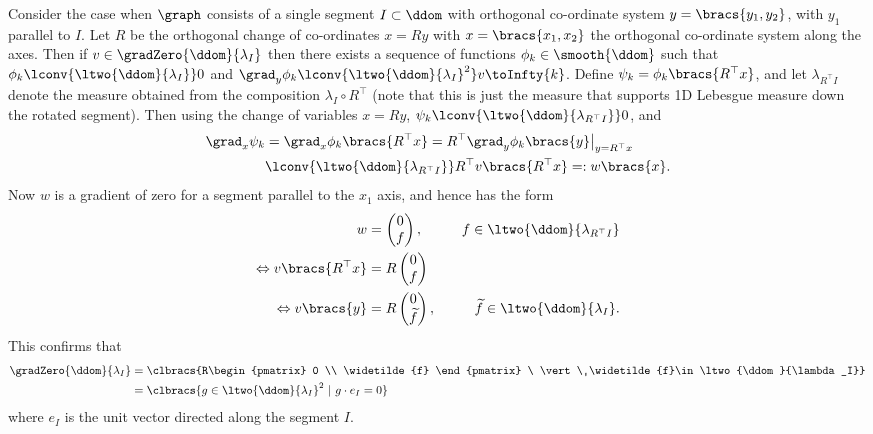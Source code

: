 Consider the case when $\graph$ consists of a single segment $I\subset\ddom$ with orthogonal co-ordinate system $y=\bracs{y_1,y_2}$, with $y_1$ parallel to $I$.
Let $R$ be the orthogonal change of co-ordinates $x=Ry$ with $x=\bracs{x_1,x_2}$ the orthogonal co-ordinate system along the axes.
Then if $v\in\gradZero{\ddom}{\lambda_I}$ then there exists a sequence of functions $\phi_k\in\smooth{\ddom}$ such that $\phi_k\lconv{\ltwo{\ddom}{\lambda_I}}0$ and $\grad_y\phi_k\lconv{\ltwo{\ddom}{\lambda_I}^2} v \toInfty{k}$.
Define $\psi_k = \phi_k\bracs{R^{\top}x}$, and let $\lambda_{R^{\top}I}$ denote the measure obtained from the composition $\lambda_I\circ R^{\top}$ (note that this is just the measure that supports 1D Lebesgue measure down the rotated segment).
Then using the change of variables $x=Ry$, $\psi_k\lconv{\ltwo{\ddom}{\lambda_{R^{\top}I}}}0$, and
\begin{align*}
	\grad_x\psi_k &= \grad_x\phi_k\bracs{R^{\top}x} = R^{\top}\grad_y\phi_k\bracs{y}\big\vert_{y=R^{\top}x} \\
	&\lconv{\ltwo{\ddom}{\lambda_{R^{\top}I}}} R^{\top}v\bracs{R^{\top}x} =: w\bracs{x}.
\end{align*}
Now $w$ is a gradient of zero for a segment parallel to the $x_1$ axis, and hence has the form
\begin{align*}
	w &= \begin{pmatrix} 0 \\ f \end{pmatrix}, &\quad f\in\ltwo{\ddom}{\lambda_{R^{\top}I}} \\
	\Leftrightarrow v\bracs{R^{\top}x} &= R\begin{pmatrix} 0 \\ f \end{pmatrix} &\\
	\Leftrightarrow v\bracs{y} &= R\begin{pmatrix} 0 \\ \widetilde{f} \end{pmatrix}, &\quad \widetilde{f}\in\ltwo{\ddom}{\lambda_I}.
\end{align*}
This confirms that 
\begin{align*}
	\gradZero{\ddom}{\lambda_I} &= \clbracs{R\begin{pmatrix} 0 \\ \widetilde{f} \end{pmatrix} \ \vert \ \widetilde{f}\in\ltwo{\ddom}{\lambda_I}} \\
	&= \clbracs{g\in\ltwo{\ddom}{\lambda_I}^2 \ \vert \ g\cdot e_{I} = 0}
\end{align*}
where $e_I$ is the unit vector directed along the segment $I$.

